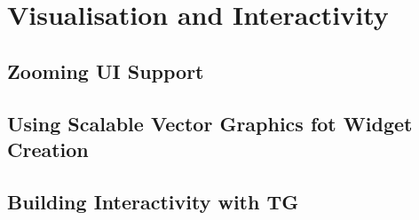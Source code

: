 \chapter{Visualisation and Interactivity}\label{ch01:07}

\section{Zooming UI Support}

\section{Using Scalable Vector Graphics fot Widget Creation}

\section{Building Interactivity with TG}